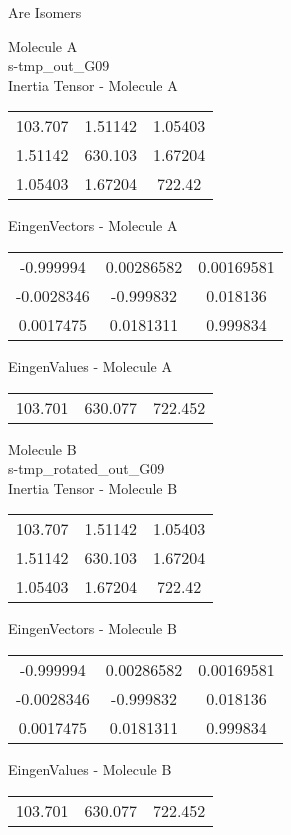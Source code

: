 \begin{center}
\vtab
\vtab
\textcolor{NavyBlue}{\Large Are Isomers}
\end{center}
\newpage
\begin{multicols}{2}
\begin{center}
Molecule A \\ 
s-tmp\_out\_G09
\\
Inertia Tensor - Molecule A \\
\vtab
\begin{tabular}{|c c c|}
103.707	 & 	1.51142	 & 	1.05403	 \\
1.51142	 & 	630.103	 & 	1.67204	 \\
1.05403	 & 	1.67204	 & 	722.42
\end{tabular}

\vtab
 EingenVectors - Molecule A     \\
\vtab
\begin{tabular}{|c c c|}
-0.999994	 & 	0.00286582	 & 	0.00169581	 \\
-0.0028346	 & 	-0.999832	 & 	0.018136	 \\
0.0017475	 & 	0.0181311	 & 	0.999834
\end{tabular}

\vtab
 EingenValues - Molecule A     \\
\vtab
\begin{tabular}{|c c c|}
103.701	 & 	630.077	 & 	722.452
\end{tabular}
\columnbreak

Molecule B \\ 
s-tmp\_rotated\_out\_G09
\\
Inertia Tensor - Molecule B \\
\vtab
\begin{tabular}{|c c c|}
103.707	 & 	1.51142	 & 	1.05403	 \\
1.51142	 & 	630.103	 & 	1.67204	 \\
1.05403	 & 	1.67204	 & 	722.42
\end{tabular}

\vtab
 EingenVectors - Molecule B     \\
\vtab
\begin{tabular}{|c c c|}
-0.999994	 & 	0.00286582	 & 	0.00169581	 \\
-0.0028346	 & 	-0.999832	 & 	0.018136	 \\
0.0017475	 & 	0.0181311	 & 	0.999834
\end{tabular}

\vtab
 EingenValues - Molecule B     \\
\vtab
\begin{tabular}{|c c c|}
103.701	 & 	630.077	 & 	722.452
\end{tabular}

\end{center}
\end{multicols}
